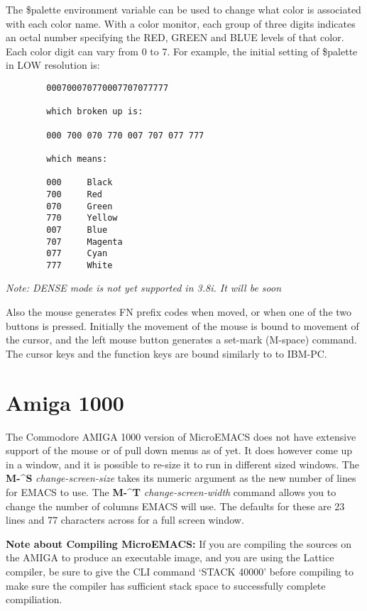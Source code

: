 The \$palette environment variable can be used to change what
color is associated with each color name.  With a color monitor, each
group of three digits indicates an octal number specifying the RED,
GREEN and BLUE levels of that color.  Each color digit can vary from 0
to 7.  For example, the initial setting of \$palette in LOW resolution is:

\begin{verbatim}
        000700070770007707077777

        which broken up is:

        000 700 070 770 007 707 077 777

        which means:

        000     Black
        700     Red
        070     Green
        770     Yellow
        007     Blue
        707     Magenta
        077     Cyan
        777     White
\end{verbatim}

{\it{}Note: DENSE mode is not yet supported in 3.8i.  It will be
soon}

Also the mouse generates FN prefix codes when moved, or when one
of the two buttons is pressed.  Initially the movement of the mouse is
bound to movement of the cursor, and the left mouse button generates a
set-mark (M-space) command.  The cursor keys and the function keys are
bound similarly to to IBM-PC.
\section{Amiga 1000}

The Commodore AMIGA 1000 version of MicroEMACS does not have
extensive support of the mouse or of pull down menus as of yet.  It does
however come up in a window, and it is possible to re-size it to run in
different sized windows.  The {\bf{}M-\^{}S} {\it{}change-screen-size}
 takes its numeric argument as the new number
of lines for EMACS to use.  The {\bf{}M-\^{}T} {\it{}change-screen-width}
 command allows you to change the number of
columns EMACS will use.  The defaults for these are 23 lines and 77
characters across for a full screen window.

{\bf Note about Compiling MicroEMACS:}
If you are compiling the sources on the AMIGA to produce an
executable image, and you are using the Lattice compiler, be sure to
give the CLI command `STACK 40000' before compiling to make sure the
compiler has sufficient stack space to successfully complete
compiliation.

